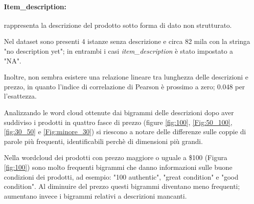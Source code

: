 \paragraph{Item\_description:} rappresenta la descrizione del prodotto sotto forma
di dato non strutturato.

Nel dataset sono presenti 4 istanze senza descrizione e
circa 82 mila con la stringa "no description yet"; in entrambi i casi
\textit{item\_description} è stato impostato a "NA".

Inoltre, non sembra esistere una relazione lineare tra lunghezza delle
descrizioni e prezzo, in quanto l'indice di correlazione di Pearson è prossimo a
zero; 0.048 per l'esattezza.

Analizzando le word cloud ottenute dai bigrammi delle descrizioni dopo aver
suddiviso i prodotti in quattro fasce di prezzo (figure \ref{fig:100},
\ref{Fig:50_100}, \ref{fig:30_50} e \ref{Fig:minore_30}) si riescono a notare
delle differenze sulle coppie di parole più frequenti, identificabili perchè di
dimensioni più grandi.

Nella wordcloud dei prodotti con prezzo maggiore o uguale a \$100 (Figura
\ref{fig:100}) sono molto frequenti bigrammi che danno informazioni sulle buone
condizioni dei prodotti, ad esempio: "100 authentic", "great condition" e "good
condition". Al diminuire del prezzo questi bigrammi diventano meno frequenti;
aumentano invece i bigrammi relativi a descrizioni mancanti.

